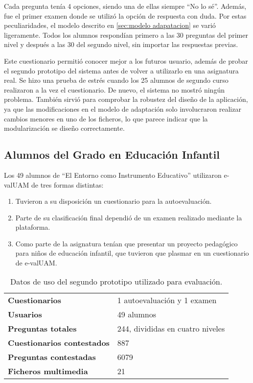 Cada pregunta tenía 4 opciones, siendo una de ellas siempre ``No lo sé''. Además, fue el primer examen donde se utilizó la opción de respuesta con duda. Por estas peculiaridades, el modelo descrito en \ref{sec:modelo adapatacion} se varió ligeramente. Todos los alumnos respondían primero a las 30 preguntas del primer nivel y después a las 30 del segundo nivel, sin importar las respuestas previas.

Este cuestionario permitió conocer mejor a los futuros usuario, además de probar el segundo prototipo del sistema antes de volver a utilizarlo en una asignatura real. Se hizo una prueba de estrés cuando los 25 alumnos de segundo curso realizaron a la vez el cuestionario. De nuevo, el sistema no mostró ningún problema. También sirvió para comprobar la robustez del diseño de la aplicación, ya que las modificaciones en el modelo de adaptación solo involucraron realizar cambios menores en uno de los ficheros, lo que parece indicar que la modularización se diseño correctamente.

\subsection{Alumnos del Grado en Educación Infantil}

Los 49 alumnos de ``El Entorno como Instrumento Educativo'' utilizaron \acrshort{e-valUAM} de tres formas distintas:

\begin{enumerate}
 	\item Tuvieron a su disposición un cuestionario para la autoevaluación. 
 	\item Parte de su clasificación final dependió de un examen realizado mediante la plataforma. 
 	\item Como parte de la asignatura tenían que presentar un proyecto pedagógico para niños de educación infantil, que tuvieron que plasmar en un cuestionario de \acrshort{e-valUAM}. 
\end{enumerate}


\begin{table}[hc]
	\centering
	\begin{tabular}{l|l}
		{\bf Cuestionarios}             & 1 autoevaluación y 1 examen \\ 
		{\bf Usuarios}                  & 49 alumnos\\
		{\bf Preguntas totales}         & 244, divididas en cuatro niveles    \\ 
		{\bf Cuestionarios contestados} & 887                              \\ 
		{\bf Preguntas contestadas}     & 6079                             \\ 
		{\bf Ficheros multimedia}		& 21							   \\
	\end{tabular}
	\caption{Datos de uso del segundo prototipo utilizado para evaluaci\'on.}
\end{table}


